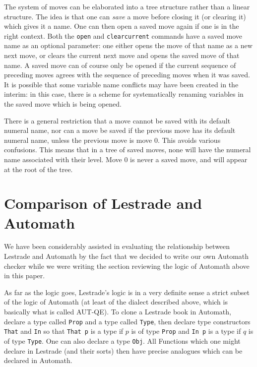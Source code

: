 \documentclass[12pt]{article}
\begin{document}
The system of moves can be elaborated into a tree structure rather than a linear structure.  The idea is that one can {\em save\/} a move before closing it (or clearing it) which gives it a name.  One can then open a saved move again if one is in the right context.  Both the {\tt open} and {\tt clearcurrent} commands have a saved move name as an optional parameter:  one either opens the move of that name as a new next move, or clears the current next move and opens the saved move of that name.  A saved move can of course only be opened if the current sequence of preceding moves agrees with the sequence of preceding moves when it was saved.  It is possible that some variable name conflicts may have been created in the interim:  in this case, there is a scheme for systematically renaming variables in the saved move which is being opened.

There is a general restriction that a move cannot be saved with its default numeral name, nor can a move be saved if the previous move has its default numeral name, unless the previous move is move 0.  This avoids various confusions.  This means that in a tree of saved moves, none will have the numeral name associated with their level.  Move 0 is never a saved move, and will appear at the root of the tree.

\newpage

\section{Comparison of Lestrade and Automath}

We have been considerably assisted in evaluating the relationship between Lestrade and Automath by the fact that we decided to write our own Automath checker while we were writing the section reviewing the logic of Automath above in this paper.

As far as the logic goes, Lestrade's logic is in a very definite sense a strict subset of the logic of Automath (at least of the dialect described above, which is basically what is called AUT-QE).  To clone a Lestrade book in Automath, declare a type called {\tt Prop} and a type called {\tt Type}, then declare type constructors {\tt That} and {\tt In} so that
{\tt That p} is a type if $p$ is of type {\tt Prop} and {\tt In p} is a type if $q$ is of type {\tt Type}.  One can also declare a type {\tt Obj}.  All Functions which one might declare in
Lestrade (and their sorts) then have precise analogues which can be declared in Automath.
\end{document}
